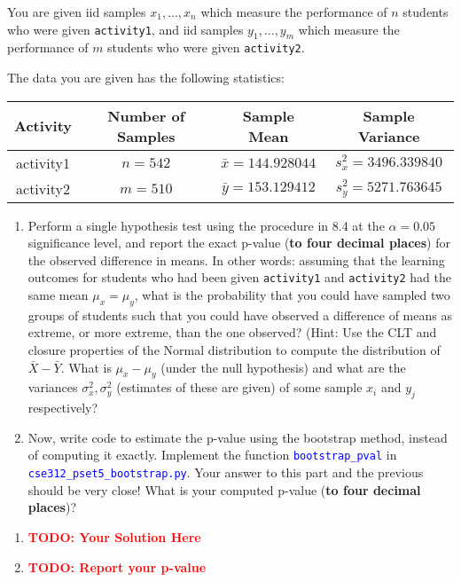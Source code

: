 \documentclass[12pt]{article}
\def\todo#1{\textcolor{red}{\textbf{#1}}}
\def\code#1{\textcolor{blue}{\texttt{#1}}}
\renewcommand{\|}{\mid}
\begin{document}
\begin{enumerate}
    You are given iid samples $x_1,\dots,x_n$ which measure the performance of $n$ students who were given \texttt{activity1}, and iid samples $y_1,\dots,y_m$ which measure the performance of $m$ students who were given \texttt{activity2}.
    
    The data you are given has the following statistics:
    \begin{center}
 \begin{tabular}{||c |c| c| c||} 
 \hline
 Activity & Number of Samples & Sample Mean & Sample Variance \\ [0.5ex] 
 \hline\hline
 activity1 & $n=542$ & $\bar{x}=144.928044$ & $s^2_x=3496.339840$ \\ 
 \hline
 activity2 & $m=510$ & $\bar{y}=153.129412$ & $s^2_y=5271.763645$ \\
 \hline
\end{tabular}
\end{center}
    \begin{enumerate}
        \item Perform a single hypothesis test using the procedure in 8.4 at the $\alpha=0.05$ significance level, and report the exact p-value (\textbf{to four decimal places}) for the observed difference in means. In other words: assuming that the learning outcomes for students who had been given \texttt{activity1} and \texttt{activity2} had the same mean $\mu_x=\mu_y$, what is the probability that you could have sampled two groups of students such that you could have observed a difference of means as extreme, or more extreme, than the one observed? (Hint: Use the CLT and closure properties of the Normal distribution to compute the distribution of $\bar{X}-\bar{Y}$. What is $\mu_x-\mu_y$ (under the null hypothesis) and what are the variances $\sigma^2_x,\sigma^2_y$ (estimates of these are given) of some sample $x_i$ and $y_j$ respectively?
        \item Now, write code to estimate the p-value using the bootstrap method, instead of computing it exactly. Implement the function \code{bootstrap\_pval} in \code{cse312\_pset5\_bootstrap.py}. Your answer to this part and the previous should be very close! What is your computed p-value (\textbf{to four decimal places})?
    \end{enumerate}
    
      \begin{tcolorbox}
\begin{enumerate}
\item \todo{TODO: Your Solution Here}
\item \todo{TODO: Report your p-value}
\end{enumerate}
\end{tcolorbox}


\end{enumerate}
\end{document}
